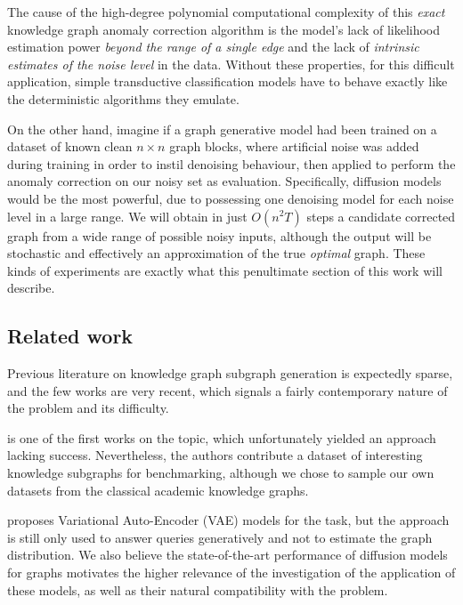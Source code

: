 The cause of the high-degree polynomial computational complexity of this \emph{exact} knowledge graph anomaly correction algorithm is the model's lack of likelihood estimation power \emph{beyond the range of a single edge} and the lack of \emph{intrinsic estimates of the noise level} in the data. Without these properties, for this difficult application, simple transductive classification models have to behave exactly like the deterministic algorithms they emulate.

On the other hand, imagine if a graph generative model had been trained on a dataset of known clean $n \times n$ graph blocks, where artificial noise was added during training in order to instil denoising behaviour, then applied to perform the anomaly correction on our noisy set as evaluation. Specifically, diffusion models would be the most powerful, due to possessing one denoising model for each noise level in a large range. We will obtain in just $O(n^2 T)$ steps a candidate corrected graph from a wide range of possible noisy inputs, although the output will be stochastic and effectively an approximation of the true \emph{optimal} graph. These kinds of experiments are exactly what this penultimate section of this work will describe.

\subsection{Related work}

Previous literature on knowledge graph subgraph generation is expectedly sparse, and the few works are very recent, which signals a fairly contemporary nature of the problem and its difficulty. 

\cite{thanapalasingam_intelligraphs_2023} is one of the first works on the topic, which unfortunately yielded an approach lacking success. Nevertheless, the authors contribute a dataset of interesting knowledge subgraphs for benchmarking, although we chose to sample our own datasets from the classical academic knowledge graphs.

\cite{mahmoudzadeh_deep_2024} proposes Variational Auto-Encoder (VAE) models for the task, but the approach is still only used to answer queries generatively and not to estimate the graph distribution. We also believe the state-of-the-art performance of diffusion models for graphs motivates the higher relevance of the investigation of the application of these models, as well as their natural compatibility with the problem. 


